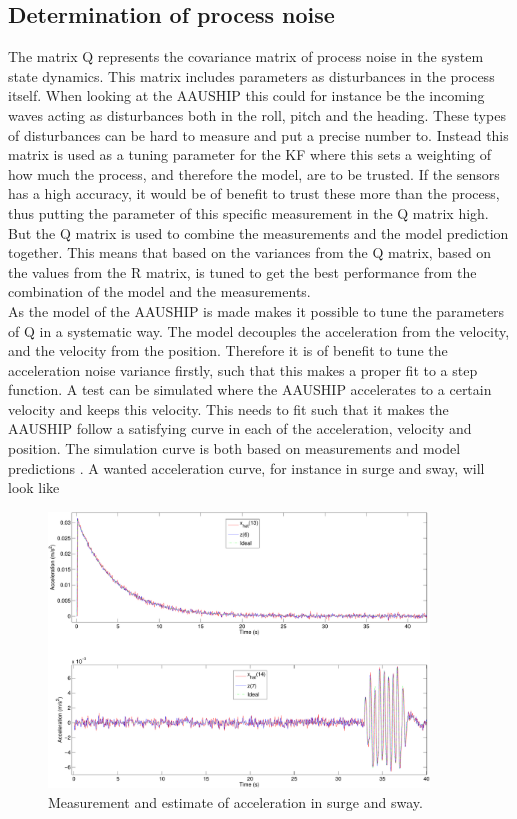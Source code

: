 \subsection{Determination of process noise}
The matrix Q represents the covariance matrix of process noise in the system state dynamics. This matrix includes parameters as disturbances in the process itself. When looking at the AAUSHIP this could for instance be the incoming waves acting as disturbances both in the roll, pitch and the heading. These types of disturbances can be hard to measure and put a precise number to. Instead this matrix is used as a tuning parameter for the \ac{KF} where this sets a weighting of how much the process, and therefore the model, are to be trusted. If the sensors has a high accuracy, it would be of benefit to trust these more than the process, thus putting the parameter of this specific measurement in the Q matrix high. But the Q matrix is used to combine the measurements and the model prediction together. This means that based on the variances from the Q matrix, based on the values from the R matrix, is tuned to get the best performance from the combination of the model and the measurements.\\
As the model of the AAUSHIP is made makes it possible to tune the parameters of Q in a systematic way. The model decouples the acceleration from the velocity, and the velocity from the position. Therefore it is of benefit to tune the acceleration noise variance firstly, such that this makes a proper fit to a step function. A test can be simulated where the AAUSHIP accelerates to a certain velocity and keeps this velocity. This needs to fit such that it makes the AAUSHIP follow a satisfying curve in each of the acceleration, velocity and position. The simulation curve is both based on measurements and model predictions . A wanted acceleration curve, for instance in surge and sway, will look like
\begin{figure}
  \includegraphics[width=0.9\textwidth]{../../code/matlab/accel0,00001}
  \caption{Measurement and estimate of acceleration in surge and sway.}
  \label{fig:uvacceltest}
\end{figure}
